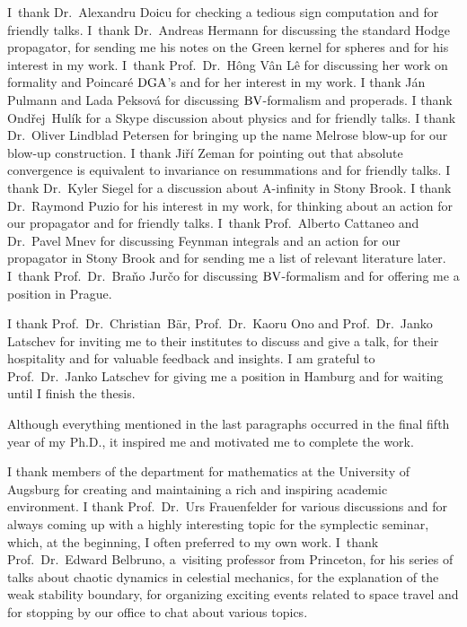 \documentclass[\MainFolder/Text.tex]{subfiles}
\begin{document}
I~thank Dr.~Alexandru Doicu for checking a tedious sign computation and for friendly talks. I~thank Dr.~Andreas Hermann for discussing the standard Hodge propagator, for sending me his notes on the Green kernel for spheres and for his interest in my work. I~thank Prof.~Dr.~Hông Vân Lê for discussing her work on formality and Poincar\'e $\mathrm{DGA}$'s and for her interest in my work. I thank J\'an Pulmann and Lada Peksov\'a for discussing $\mathrm{BV}$-formalism and properads. I thank Ond\v{r}ej~Hul\'ik for a Skype discussion about physics and for friendly talks. I thank Dr.~Oliver Lindblad Petersen for bringing up the name Melrose blow-up for our blow-up construction. I thank Ji\v{r}\'i Zeman for pointing out that absolute convergence is equivalent to invariance on resummations and for friendly talks. I thank Dr.~Kyler Siegel for a discussion about A-infinity in Stony Brook. I thank Dr.~Raymond Puzio for his interest in my work, for thinking about an action for our propagator and for friendly talks. I~thank Prof.~Alberto Cattaneo and Dr.~Pavel Mnev for discussing Feynman integrals and an action for our propagator in Stony Brook and for sending me a list of relevant literature later. I~thank Prof.~Dr.~Bra\v{n}o Jur\v{c}o for discussing $\mathrm{BV}$-formalism and for offering me a position in Prague.

I thank Prof.~Dr.~Christian~B\"ar, Prof.~Dr.~Kaoru Ono and Prof.~Dr.~Janko Latschev for inviting me to their institutes to discuss and give a talk, for their hospitality and for valuable feedback and insights. I am grateful to Prof.~Dr.~Janko Latschev for giving me a position in Hamburg and for waiting until I finish the thesis.

Although everything mentioned in the last paragraphs occurred in the final fifth year of my Ph.D., it inspired me and motivated me to complete the work.

I thank members of the department for mathematics at the University of Augsburg for creating and maintaining a rich and inspiring academic environment. I thank Prof.~Dr.~Urs Frauenfelder for various discussions and for always coming up with a highly interesting topic for the symplectic seminar, which, at the beginning, I often preferred to my own work. I~thank Prof.~Dr.~Edward Belbruno, a~visiting professor from Princeton, for his series of talks about chaotic dynamics in celestial mechanics, for the explanation of the weak stability boundary, for organizing exciting events related to space travel and for stopping by our office to chat about various topics.
\end{document}
